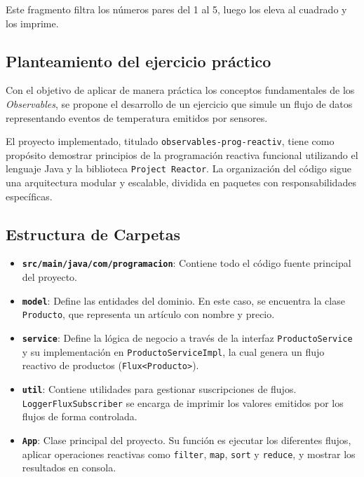Este fragmento filtra los números pares del 1 al 5, luego los eleva al cuadrado y los imprime.

\subsection{Planteamiento del ejercicio práctico}

Con el objetivo de aplicar de manera práctica los conceptos fundamentales de los \textit{Observables}, se propone el desarrollo de un ejercicio que simule un flujo de datos representando eventos de temperatura emitidos por sensores.

El proyecto implementado, titulado \texttt{observables-prog-reactiv}, tiene como propósito demostrar principios de la programación reactiva funcional utilizando el lenguaje Java y la biblioteca \texttt{Project Reactor}. La organización del código sigue una arquitectura modular y escalable, dividida en paquetes con responsabilidades específicas.

\subsection{Estructura de Carpetas}

\begin{itemize}
    \item \textbf{\texttt{src/main/java/com/programacion}}: Contiene todo el código fuente principal del proyecto.
    \item \textbf{\texttt{model}}: Define las entidades del dominio. En este caso, se encuentra la clase \texttt{Producto}, que representa un artículo con nombre y precio.
    \item \textbf{\texttt{service}}: Define la lógica de negocio a través de la interfaz \texttt{ProductoService} y su implementación en \texttt{ProductoServiceImpl}, la cual genera un flujo reactivo de productos (\texttt{Flux<Producto>}).
    \item \textbf{\texttt{util}}: Contiene utilidades para gestionar suscripciones de flujos. \texttt{LoggerFluxSubscriber} se encarga de imprimir los valores emitidos por los flujos de forma controlada.
    \item \textbf{\texttt{App}}: Clase principal del proyecto. Su función es ejecutar los diferentes flujos, aplicar operaciones reactivas como \texttt{filter}, \texttt{map}, \texttt{sort} y \texttt{reduce}, y mostrar los resultados en consola.
\end{itemize}

